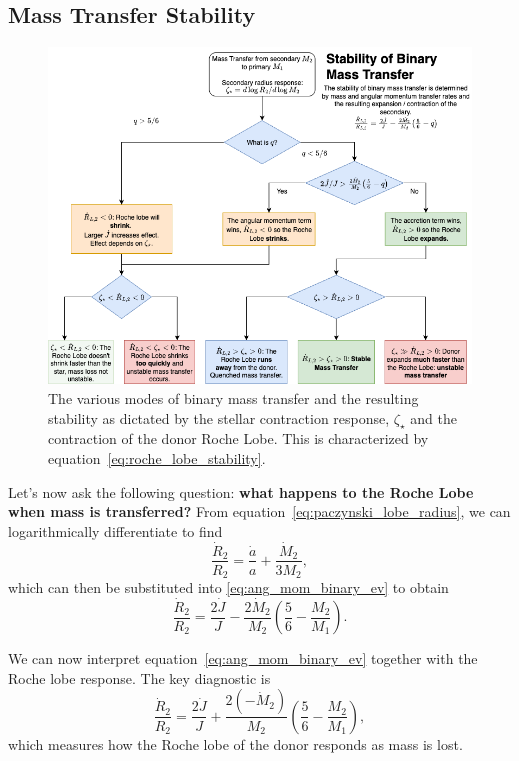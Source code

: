 \subsection{Mass Transfer Stability}
\begin{figure}[ht!]
    \centering
    \includegraphics[width=1\linewidth]{Pictures/figures/binary_mass_accretion.png}
    \caption{The various modes of binary mass transfer and the resulting stability as dictated by the stellar contraction response, $\zeta_\star$ and the contraction of the donor Roche Lobe. This is characterized by equation~\eqref{eq:roche_lobe_stability}.}
    \label{fig:roche_transfer_stability}
\end{figure}

Let's now ask the following question: \textbf{what happens to the Roche Lobe when mass is transferred?} 
From equation~\eqref{eq:paczynski_lobe_radius}, we can logarithmically differentiate to find
\[
\boxed{
\frac{\dot{R}_2}{R_2} = \frac{\dot{a}}{a} + \frac{\dot{M}_2}{3M_2},
}
\]
which can then be substituted into \eqref{eq:ang_mom_binary_ev} to obtain
\begin{equation}
\label{eq:roche_lobe_stability}
\boxed{
    \frac{\dot{R}_2}{R_2} = \frac{2\dot{J}}{J} - \frac{2\dot{M}_2}{M_2}\left(\frac{5}{6}-\frac{M_2}{M_1}\right).
}
\end{equation}
\par
We can now interpret equation~\eqref{eq:ang_mom_binary_ev}
together with the Roche lobe response.  The key diagnostic is
\[
\frac{\dot{R}_2}{R_2} = \frac{2\dot{J}}{J}
   + \frac{2(-\dot{M}_2)}{M_2}\!\left(\frac{5}{6} - \frac{M_2}{M_1}\right),
\]
which measures how the Roche lobe of the donor responds as mass is lost.

